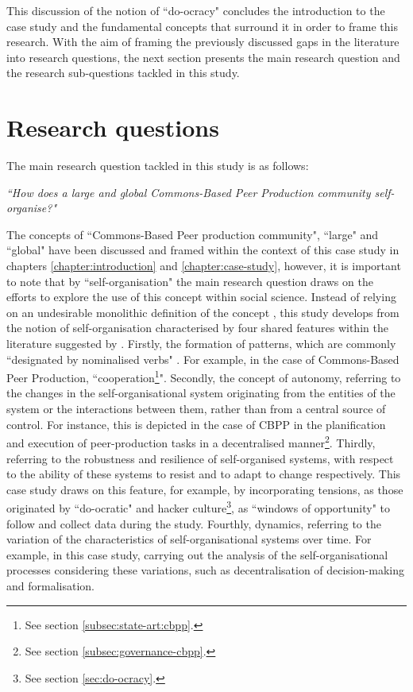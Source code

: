 This discussion of the notion of ``do-ocracy" concludes the introduction to the case study and the fundamental concepts that surround it in order to frame this research. With the aim of framing the previously discussed gaps in the literature into research questions, the next section presents the main research question and the research sub-questions tackled in this study.

\section{Research questions}
\label{subsubsec:state-art:drupal:case-study}

The main research question tackled in this study is as follows:

\emph{``How does a large and global Commons-Based Peer Production community self-organise?"}

The concepts of ``Commons-Based Peer production community", ``large" and ``global" have been discussed and framed within the context of this case study in chapters \ref{chapter:introduction} and \ref{chapter:case-study}, however, it is important to note that by ``self-organisation" the main research question draws on the efforts to explore the use of this concept within social science. Instead of relying on an undesirable monolithic definition of the concept  \parencite{gilbert2015self, anzola2016self}, this study develops from the notion of self-organisation characterised by four shared features within the literature suggested by \textcite{gilbert2015self}. Firstly, the formation of patterns, which are commonly ``designated by nominalised verbs" \parencite[4]{anzola2016self}. For example, in the case of Commons-Based Peer Production, ``cooperation\footnote{See section \ref{subsec:state-art:cbpp}.}". Secondly, the concept of autonomy, referring to the changes in the self-organisational system originating from the entities of the system or the interactions between them, rather than from a central source of control. For instance, this is depicted in the case of CBPP in the planification and execution of peer-production tasks in a decentralised manner\footnote{See section \ref{subsec:governance-cbpp}.}. Thirdly, referring to the robustness and resilience of self-organised systems, with respect to the ability of these systems to resist and to adapt to change respectively. This case study draws on this feature, for example, by incorporating tensions, as those originated by ``do-ocratic" and hacker culture\footnote{See section \ref{sec:do-ocracy}.}, as ``windows of opportunity" to follow and collect data during the study. Fourthly, dynamics, referring to the variation of the characteristics of self-organisational systems over time. For example, in this case study, carrying out the analysis of the self-organisational processes considering these variations, such as decentralisation of decision-making and formalisation. 

